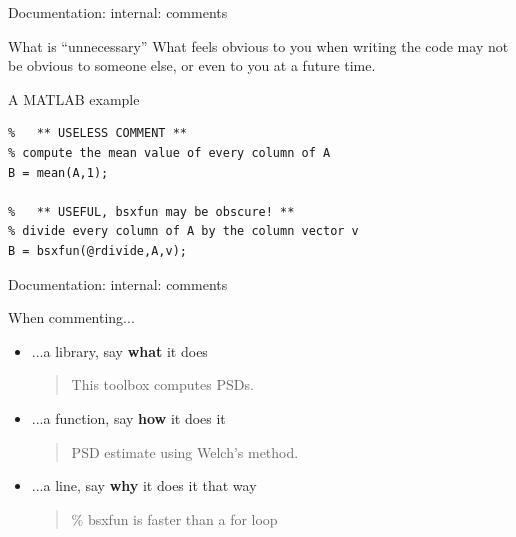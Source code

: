 \documentclass[10pt]{beamer}
\begin{document}
\begin{frame}[t,fragile]{Documentation: internal: comments}

	\begin{block}{What is ``unnecessary''}
		What feels obvious to you when writing the code may not be
		obvious to someone else, or even to you at a future time.
	\end{block}

	\begin{block}{A MATLAB example}
\begin{verbatim}
%   ** USELESS COMMENT **
% compute the mean value of every column of A
B = mean(A,1);

%   ** USEFUL, bsxfun may be obscure! **
% divide every column of A by the column vector v
B = bsxfun(@rdivide,A,v);
\end{verbatim}
	\end{block}

\end{frame}

\begin{frame}[t]{Documentation: internal: comments}
	\Large
	\begin{block}{When commenting...}
		\begin{itemize}
			\item ...a library, say \textbf{what} it does \\
				\begin{quotation}
					This toolbox computes PSDs.
				\end{quotation}
			\item ...a function, say \textbf{how} it does it \\
				\begin{quotation}
					PSD estimate using Welch's method.
				\end{quotation}
			\item ...a line, say \textbf{why} it does it that way \\
				\begin{quotation}
					\% bsxfun is faster than a for loop
				\end{quotation}
		\end{itemize}
	\end{block}
\end{frame}
\end{document}
